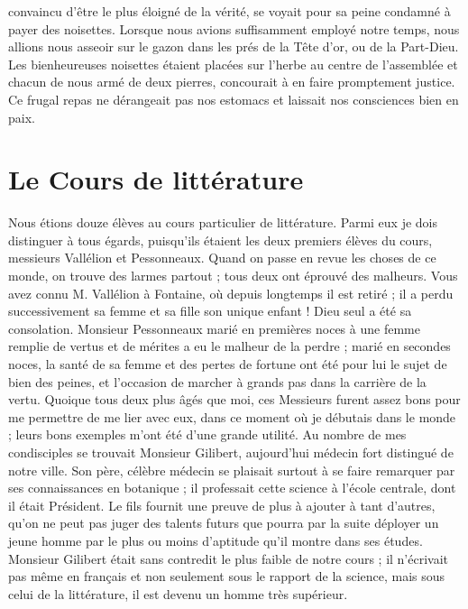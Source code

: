 \documentclass[11pt,a4paper]{report}
\begin{document}
convaincu d'être le plus éloigné de la vérité, se voyait pour sa peine condamné à payer des noisettes. Lorsque nous avions suffisamment employé notre temps, nous allions nous asseoir sur le gazon dans les prés de la Tête d'or, ou de la Part-Dieu. Les bienheureuses noisettes étaient placées sur l'herbe au centre de l'assemblée et chacun de nous armé de deux pierres, concourait à en faire promptement justice. Ce frugal repas ne dérangeait pas nos estomacs et laissait nos consciences bien en paix.

\section*{Le Cours de littérature}

Nous étions douze élèves au cours particulier de littérature. Parmi eux je dois distinguer à tous égards, puisqu'ils étaient les deux premiers élèves du cours, messieurs Vallélion et Pessonneaux. Quand on passe en revue les choses de ce monde, on trouve des larmes partout ; tous deux ont éprouvé des malheurs. Vous avez connu M. Vallélion à Fontaine, où depuis longtemps il est retiré ; il a perdu successivement sa femme et sa fille son unique enfant ! Dieu seul a été sa consolation. Monsieur Pessonneaux marié en premières noces à une femme remplie de vertus et de mérites a eu le malheur de la perdre ; marié en secondes noces, la santé de sa femme et des pertes de fortune ont été pour lui le sujet de bien des peines, et l'occasion de marcher à grands pas dans la carrière de la vertu. Quoique tous deux plus âgés que moi, ces Messieurs furent assez bons pour me permettre de me lier avec eux, dans ce moment où je débutais dans le monde ; leurs bons exemples m'ont été d'une grande utilité. Au nombre de mes condisciples se trouvait Monsieur Gilibert, aujourd'hui médecin fort distingué de notre ville. Son père, célèbre médecin se plaisait surtout à se faire remarquer par ses connaissances en botanique ; il professait cette science à l'école centrale, dont il était Président. Le fils fournit une preuve de plus à ajouter à tant d'autres, qu'on ne peut pas juger des talents futurs que pourra par la suite déployer un jeune homme par le plus ou moins d'aptitude qu'il montre dans ses études. Monsieur Gilibert était sans contredit le plus faible de notre cours ; il n'écrivait pas même en français et non seulement sous le rapport de la science, mais sous celui de la littérature, il est devenu un homme très supérieur.
\end{document}
